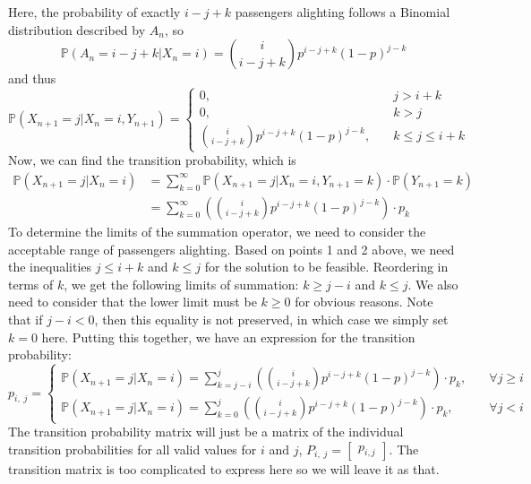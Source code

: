 \documentclass[12pt]{article}
\begin{document}
\noindent Here, the probability of exactly $i - j + k$ passengers alighting follows a Binomial distribution described by $A_n$, so \begin{equation}
    \mathbb{P}(A_n = i - j + k | X_n = i) = \binom{i}{i - j + k}p^{i - j + k}(1-p)^{j - k}
\end{equation} and thus \begin{equation}
    \mathbb{P}(X_{n+1} = j | X_n = i, Y_{n+1}) = \begin{cases}
        0, \quad & j > i + k \\ 
        0, \quad & k > j \\
        \displaystyle\binom{i}{i-j+k}p^{i - j + k}(1-p)^{j - k}, \quad & k \leq j \leq i + k  
    \end{cases}
\end{equation} Now, we can find the transition probability, which is \begin{align*}
    \mathbb{P}(X_{n+1} = j | X_n = i) &= \sum_{k=0}^{\infty} \mathbb{P}(X_{n+1} = j | X_n = i, Y_{n+1} = k) \cdot \mathbb{P}(Y_{n+1} = k) \\ 
    &= \sum_{k=0}^{\infty} \left( \displaystyle\binom{i}{i-j+k}p^{i - j + k}(1-p)^{j - k} \right) \cdot p_k
\end{align*} To determine the limits of the summation operator, we need to consider the acceptable range of passengers alighting. Based on points 1 and 2 above, we need the inequalities $j \leq i + k$ and $k \leq j$ for the solution to be feasible. Reordering in terms of $k$, we get the following limits of summation: $k \geq j - i$ and $k \leq j$. We also need to consider that the lower limit must be $k \geq 0$ for obvious reasons. Note that if $j - i < 0$, then this equality is not preserved, in which case we simply set $k = 0$ here. Putting this together, we have an expression for the transition probability: \begin{equation}\label{eq:4-pij}
     p_{i,\; j} = \begin{cases}
        \mathbb{P}(X_{n+1} = j | X_n = i) = \displaystyle\sum_{k= j - i}^{j} \left( \displaystyle\binom{i}{i-j+k}p^{i - j + k}(1-p)^{j - k} \right) \cdot p_k, \quad & \forall j \geq i \\ 
        \mathbb{P}(X_{n+1} = j | X_n = i) = \displaystyle\sum_{k=0}^{j} \left( \displaystyle\binom{i}{i-j+k}p^{i - j + k}(1-p)^{j - k} \right) \cdot p_k, \quad & \forall j < i 
     \end{cases}
\end{equation} The transition probability matrix will just be a matrix of the individual transition probabilities for all valid values for $i$ and $j$, $P_{i,\;j} = \begin{bmatrix}
    p_{i,j}
\end{bmatrix}$. The transition matrix is too complicated to express here so we will leave it as that. \\ 
\end{document}
